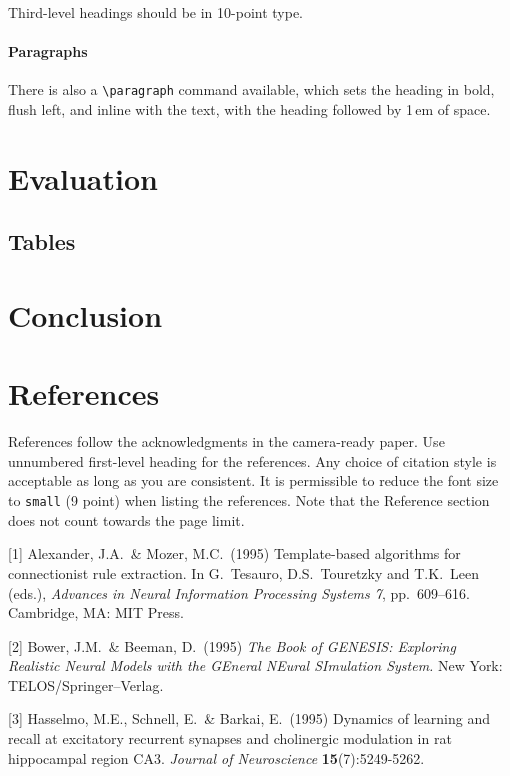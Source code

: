 \documentclass{article}
\begin{document}
Third-level headings should be in 10-point type.


\paragraph{Paragraphs}


There is also a \verb+\paragraph+ command available, which sets the heading in
bold, flush left, and inline with the text, with the heading followed by 1\,em
of space.


\section{Evaluation}


\subsection{Tables}






\section{Conclusion}




\section{References}


References follow the acknowledgments in the camera-ready paper. Use unnumbered first-level heading for
the references. Any choice of citation style is acceptable as long as you are
consistent. It is permissible to reduce the font size to \verb+small+ (9 point)
when listing the references.
Note that the Reference section does not count towards the page limit.
\medskip


{
\small


[1] Alexander, J.A.\ \& Mozer, M.C.\ (1995) Template-based algorithms for
connectionist rule extraction. In G.\ Tesauro, D.S.\ Touretzky and T.K.\ Leen
(eds.), {\it Advances in Neural Information Processing Systems 7},
pp.\ 609--616. Cambridge, MA: MIT Press.


[2] Bower, J.M.\ \& Beeman, D.\ (1995) {\it The Book of GENESIS: Exploring
  Realistic Neural Models with the GEneral NEural SImulation System.}  New York:
TELOS/Springer--Verlag.


[3] Hasselmo, M.E., Schnell, E.\ \& Barkai, E.\ (1995) Dynamics of learning and
recall at excitatory recurrent synapses and cholinergic modulation in rat
hippocampal region CA3. {\it Journal of Neuroscience} {\bf 15}(7):5249-5262.
}
\end{document}
